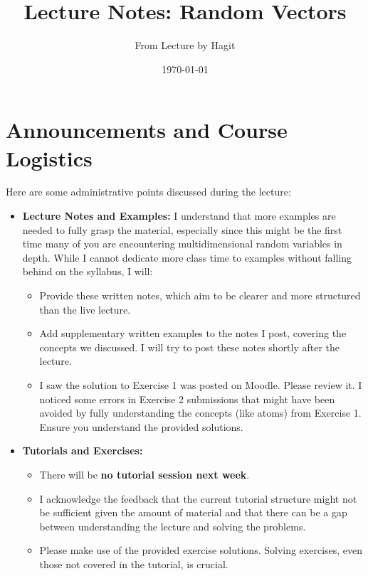 \documentclass[11pt]{article}
\title{Lecture Notes: Random Vectors}
\author{From Lecture by Hagit} %
\date{\today} %
\theoremstyle{definition} %
\begin{document}
\maketitle

\section*{Announcements and Course Logistics}

Here are some administrative points discussed during the lecture:

\begin{itemize}
    \item \textbf{Lecture Notes and Examples:} I understand that more examples are needed to fully grasp the material, especially since this might be the first time many of you are encountering multidimensional random variables in depth. While I cannot dedicate more class time to examples without falling behind on the syllabus, I will:
        \begin{itemize}
            \item Provide these written notes, which aim to be clearer and more structured than the live lecture.
            \item Add supplementary written examples to the notes I post, covering the concepts we discussed. I will try to post these notes shortly after the lecture.
            \item I saw the solution to Exercise 1 was posted on Moodle. Please review it. I noticed some errors in Exercise 2 submissions that might have been avoided by fully understanding the concepts (like atoms) from Exercise 1. Ensure you understand the provided solutions.
        \end{itemize}
    \item \textbf{Tutorials and Exercises:}
        \begin{itemize}
            \item There will be \textbf{no tutorial session next week}.
            \item I acknowledge the feedback that the current tutorial structure might not be sufficient given the amount of material and that there can be a gap between understanding the lecture and solving the problems.
            \item Please make use of the provided exercise solutions. Solving exercises, even those not covered in the tutorial, is crucial.

\end{itemize}
\end{itemize}
\end{document}
